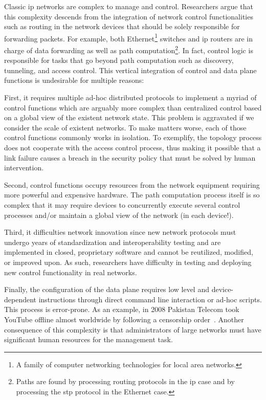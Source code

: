 

Classic \gls{ip} networks are complex to manage and control. 
Researchers argue that this complexity descends from the integration of network control functionalities such as routing 
in the network devices that should be solely responsible for forwarding packets. 
For example, both Ethernet\footnote{A family of computer networking technologies for local area networks.}  switches and \gls{ip} routers are in charge of  data forwarding as well as path computation\footnote{Paths are found by processing routing protocols in the \gls{ip} case and by processing the \gls{stp} protocol in the Ethernet case.}. 
In fact, control logic is responsible for  tasks that go beyond path computation such as  discovery, tunneling, and  access control. 
This vertical integration of control and data plane functions is  undesirable for multiple reasons:

First, it requires multiple ad-hoc distributed protocols to implement a myriad of control functions which are arguably more complex than centralized control based on a global view of the existent network state.  
This problem is aggravated if we consider the scale of existent networks. 
To make matters worse, each of those control functions commonly works in isolation. 
To exemplify, the topology process does not cooperate with the access control process, thus making it possible that a link failure causes a breach in the security policy that must be solved by human intervention. 

Second, control functions occupy resources from the network equipment requiring more powerful and expensive hardware. 
The path computation process itself is so complex that it may require devices to concurrently execute several control processes and/or maintain a global view of the network (in each device!).  

Third, it difficulties network innovation since new network protocols must undergo years of standardization and interoperability testing and are implemented in closed, proprietary software and cannot be reutilized, modified, or improved upon. 
As such, researchers have difficulty in testing and deploying new control functionality in real networks. 


Finally, the configuration of the data plane requires low level and device-dependent instructions through direct command line interaction or ad-hoc scripts. 
This process is error-prone. 
As an example, in 2008 Pakistan Telecom took YouTube offline almost worldwide by following a censorship order~\cite{McCullagh:2008fk}.
Another consequence of this complexity is that administrators of large networks  must have significant human resources for the management task.  

